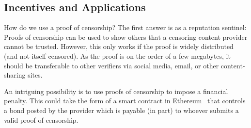 

\subsection{Incentives and Applications}

How do we use a proof of censorship?  The first answer is as a reputation sentinel:
Proofs of censorship can be used to show others that a censoring content
provider cannot be trusted. However, this only works if the proof is widely
distributed (and not itself censored). As the proof is on
the order of a few megabytes, it should be transferable to other
verifiers via social media, email, or other content-sharing sites.


An intriguing possibility is to use proofs of censorship to impose a financial
penalty. This could take the form of a smart contract in
Ethereum~\cite{ethereum} that controls a bond posted by the provider which is
payable (in part) to whoever submits a valid proof of censorship. 


